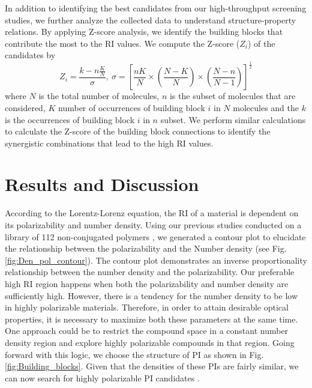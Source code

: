 In addition to identifying the best candidates from our high-throughput screening studies, we further analyze the collected data to understand structure-property relations. By applying Z-score analysis, we identify the building blocks that contribute the most to the RI values. We compute the Z-score ($Z_i$) of the candidates by
\[
Z_i=\frac{k-n\frac{K}{N} }{\sigma},\ \sigma=\left [ \frac{nK}{N}\times \left ( \frac{N-K}{N} \right )\times \left ( \frac{N-n}{N-1} \right )\right ]^{\frac{1}{2}}
\]
where $N$ is the total number of molecules, $n$ is the subset of molecules that are considered, $K$ number of occurrences of building block $i$ in $N$ molecules and the $k$ is the occurrences of building block $i$ in $n$ subset. We perform similar calculations to calculate the Z-score of the building block connections to identify the synergistic combinations that lead to the high RI values. 

\section{Results and Discussion}
\label{sec:results_discussion5}

According to the Lorentz-Lorenz equation, the RI of a material is dependent on its polarizability and number density. Using our previous studies conducted on a library of 112 non-conjugated polymers \cite{Afzal2018a}, we generated a contour plot to elucidate the relationship between the polarizability and the Number density (see Fig. \ref{fig:Den_pol_contour}). The contour plot demonstrates an inverse proportionality relationship between the number density and the polarizability. Our preferable high RI region happens when both the polarizability and number density are sufficiently high. However, there is a tendency for the number density to be low in highly polarizable materials. Therefore, in order to attain desirable optical properties, it is necessary to maximize both these parameters at the same time. One approach could be to restrict the compound space in a constant number density region and explore highly polarizable compounds in that region. Going forward with this logic, we choose the structure of PI as shown in Fig. \ref{fig:Building_blocks}. Given that the densities of these PIs are fairly similar, we can now search for highly polarizable PI candidates \cite{Privalko1997}. 


